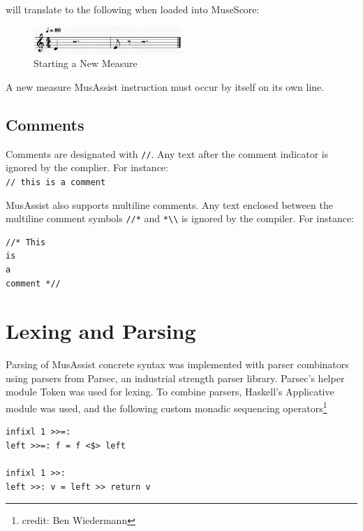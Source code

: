 \documentclass{report}
\begin{document}
will translate to the following when loaded into MuseScore:

\begin{figure}[h!]
\centering
\includegraphics[width=0.5\textwidth]{images/newmeasure}
  \caption{Starting a New Measure}
\end{figure}

A new measure MusAssist instruction must occur by itself on its own line.

\section{Comments}
Comments are designated with \verb.//.. Any text after the comment indicator is ignored by the complier. For instance:\\ \verb.// this is a comment.

MusAssist also supports multiline comments. Any text enclosed between the multiline comment symbols \verb.//*. and \verb.*\\. is ignored by the compiler. For instance:
\begin{verbatim}
//* This 
is 
a 
comment *//
\end{verbatim}


\chapter{Lexing and Parsing}

Parsing of MusAssist concrete syntax was implemented with parser combinators using parsers from Parsec, an industrial strength parser library. Parsec's helper module Token was used for lexing. To combine parsers, Haskell's Applicative module was used, and the following custom monadic sequencing operators\footnote{credit: Ben Wiedermann}
\begin{verbatim}
infixl 1 >>=:
left >>=: f = f <$> left

infixl 1 >>:
left >>: v = left >> return v
\end{verbatim}
\end{document}
